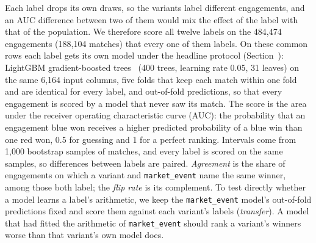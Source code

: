 Each label drops its own draws, so the variants label different engagements, and an AUC difference
between two of them would mix the effect of the label with that of the population. We therefore score
all twelve labels on the 484,474 engagements (188,104 matches) that every one of them labels. On these
common rows each label gets its own model under the headline protocol
(Section~): LightGBM gradient-boosted trees~\cite{ke2017lightgbm} (400 trees,
learning rate 0.05, 31 leaves) on the same 6,164 input columns, five folds that keep each match within
one fold and are identical for every label, and out-of-fold predictions, so that every engagement is
scored by a model that never saw its match. The score is the area under the receiver operating
characteristic curve (AUC): the probability that an engagement blue won receives a higher predicted
probability of a blue win than one red won, 0.5 for guessing and 1 for a perfect ranking. Intervals
come from 1,000 bootstrap samples of matches, and every label is scored on the same samples, so
differences between labels are paired. \emph{Agreement} is the share of engagements on which a variant
and \texttt{market\_event} name the same winner, among those both label; the \emph{flip rate} is its
complement. To test directly whether a model learns a label's arithmetic, we keep the
\texttt{market\_event} model's out-of-fold predictions fixed and score them against each variant's
labels (\emph{transfer}). A model that had fitted the arithmetic of \texttt{market\_event} should rank
a variant's winners worse than that variant's own model does.

